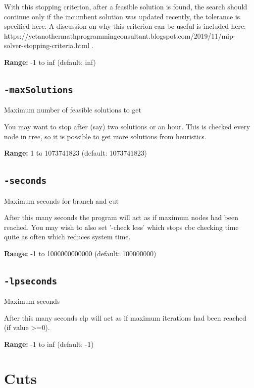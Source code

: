 \documentclass[11pt,a4paper]{article}
\begin{document}
With this stopping criterion, after a feasible solution is found, the search should continue only if the incumbent solution was updated recently, the tolerance is specified here. A discussion on why this criterion can be useful is included here: https://yetanothermathprogrammingconsultant.blogspot.com/2019/11/mip-solver-stopping-criteria.html .

\textbf{Range:} -1 to inf (default: inf)

\subsection*{\texttt{-maxSolutions}}

Maximum number of feasible solutions to get

You may want to stop after (say) two solutions or an hour. This is checked every node in tree, so it is possible to get more solutions from heuristics.

\textbf{Range:} 1 to 1073741823 (default: 1073741823)

\subsection*{\texttt{-seconds}}

Maximum seconds for branch and cut

After this many seconds the program will act as if maximum nodes had been reached. You may wish to also set '-check less' which stops cbc checking time quite as often which reduces system time.

\textbf{Range:} -1 to 1000000000000 (default: 100000000)

\subsection*{\texttt{-lpseconds}}

Maximum seconds

After this many seconds clp will act as if maximum iterations had been reached (if value >=0).

\textbf{Range:} -1 to inf (default: -1)

\section{Cuts}
\end{document}
